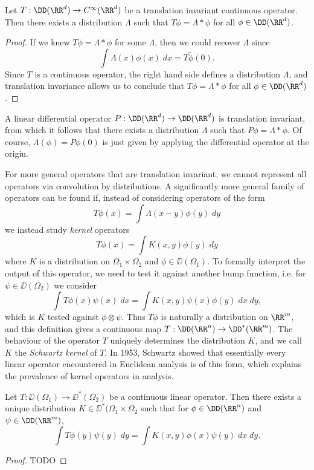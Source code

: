 \begin{theorem}
  Let $T: \DD(\RR^d) \to C^\infty(\RR^d)$ be a translation invariant continuous operator. Then there exists a distribution $\Lambda$ such that $T\phi = \Lambda * \phi$ for all $\phi \in \DD(\RR^d)$.
\end{theorem}
\begin{proof}
  If we knew $T\phi = \Lambda * \phi$ for some $\Lambda$, then we could recover $\Lambda$ since
  \[ \int \Lambda(x) \phi(x)\; dx = T \tilde{\phi}(0). \]
  Since $T$ is a continuous operator, the right hand side defines a distribution $\Lambda$, and translation invariance allows us to conclude that $T\phi = \Lambda * \phi$ for all $\phi \in \DD(\RR^d)$.
\end{proof}

\begin{example}
        A linear differential operator $P: \DD(\RR^d) \to \DD(\RR^d)$ is translation invariant, from which it follows that there exists a distribution $\Lambda$ such that $P\phi = \Lambda * \phi$. Of course, $\Lambda(\phi) = P\phi(0)$ is just given by applying the differential operator at the origin.
\end{example}

For more general operators that are translation invariant, we cannot represent all operators via convolution by distributions. A significantly more general family of operators can be found if, instead of considering operators of the form
%
\[ T\phi(x) = \int \Lambda(x - y) \phi(y)\; dy \]
%
we instead study \emph{kernel} operators
%
\[ T\phi(x) = \int K(x,y) \phi(y)\; dy \]
%
where $K$ is a distribution on $\Omega_1 \times \Omega_2$ and $\phi \in \DD(\Omega_1)$. To formally interpret the output of this operator, we need to test it against another bump function, i.e. for $\psi \in \DD(\Omega_2)$ we consider
%
\[ \int T\phi(x) \psi(x)\; dx = \int K(x,y) \psi(x) \phi(y)\; dx\; dy, \]
%
which is $K$ tested against $\phi \otimes \psi$. Thus $T\phi$ is naturally a distribution on $\RR^m$, and this definition gives a continuous map $T: \DD(\RR^n) \to \DD^*(\RR^m)$. The behaviour of the operator $T$ uniquely determines the distribution $K$, and we call $K$ the \emph{Schwartz kernel} of $T$. In 1953, Schwartz showed that essentially every linear operator encountered in Euclidean analysis is of this form, which explains the prevalence of kernel operators in analysis.

\begin{theorem}
  Let $T: \DD(\Omega_1) \to \DD^*(\Omega_2)$ be a continuous linear operator. Then there exists a unique distribution $K \in \DD^*(\Omega_1 \times \Omega_2$ such that for $\phi \in \DD(\RR^n)$ and $\psi \in \DD(\RR^m)$,
  \[ \int T\phi(y) \psi(y)\; dy = \int K(x,y) \phi(x) \psi(y)\; dx\; dy. \]
\end{theorem}
\begin{proof}
    TODO
\end{proof}

